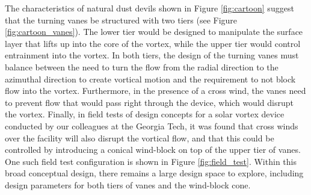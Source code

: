 


The characteristics of natural dust devils shown in Figure
\ref{fig:cartoon} suggest that the turning vanes be structured with two
tiers (see Figure \ref{fig:cartoon_vanes}). The lower tier would be
designed to manipulate the surface layer 
that lifts up into the core of the vortex, while the upper tier would
control entrainment into the vortex. In both tiers, the design of the
turning vanes must balance between the need to turn the flow from the
radial direction to the azimuthal direction to create vortical motion
and the requirement to not block flow into the vortex. Furthermore, in
the presence of a cross wind, the vanes need to prevent flow that
would pass right through the device, which would disrupt the vortex.
Finally, in field tests of design concepts for a solar vortex device
conducted by our colleagues at the Georgia Tech, it was found that cross
winds over the facility will also disrupt the vortical flow, and that
this could be controlled by introducing a conical wind-block on top of
the upper tier of vanes. One such field test configuration is shown in
Figure \ref{fig:field_test}. Within this broad conceptual design, there
remains a large design space to explore, including design parameters for
both tiers of vanes and the wind-block cone.


